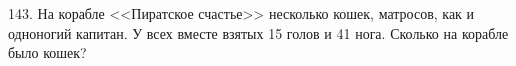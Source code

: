 143. На корабле <<Пиратское счастье>> несколько кошек, матросов, как и одноногий капитан. У всех вместе взятых 15 голов и 41 нога. Сколько на корабле было кошек?\\

